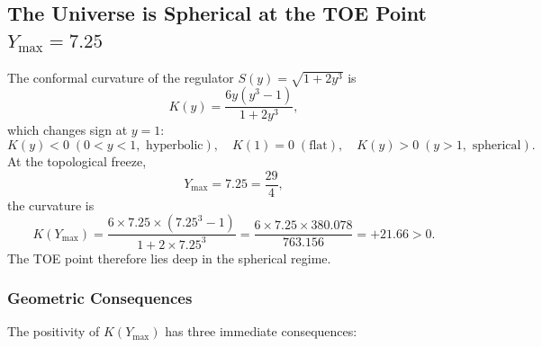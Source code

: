 \documentclass[a4paper,1pt,oneside,openany]{book}
\begin{document}
\subsection{The Universe is Spherical at the TOE Point $Y_{\max} = 7.25$}
\label{sec:spherical-universe-toe}

The conformal curvature of the regulator $S(y) = \sqrt{1+2y^3}$ is
\begin{equation}
K(y) = \frac{6y(y^3-1)}{1+2y^3},
\label{eq:conformal-curvature-toe}
\end{equation}
which changes sign at $y = 1$:
\begin{equation}
K(y) < 0 \;(0 < y < 1, \text{ hyperbolic}), \quad K(1) = 0 \;(\text{flat}), \quad K(y) > 0 \;(y > 1, \text{ spherical}).
\label{eq:curvature-signs}
\end{equation}
At the topological freeze,
\begin{equation}
Y_{\max} = 7.25 = \frac{29}{4},
\label{eq:Ymax-sphere}
\end{equation}
the curvature is
\begin{equation}
K(Y_{\max}) = \frac{6 \times 7.25 \times (7.25^3 - 1)}{1 + 2 \times 7.25^3} = \frac{6 \times 7.25 \times 380.078}{763.156} = +21.66 > 0.
\label{eq:K-Ymax}
\end{equation}
The TOE point therefore lies deep in the spherical regime.

\subsubsection{Geometric Consequences}

The positivity of $K(Y_{\max})$ has three immediate consequences:
\end{document}
